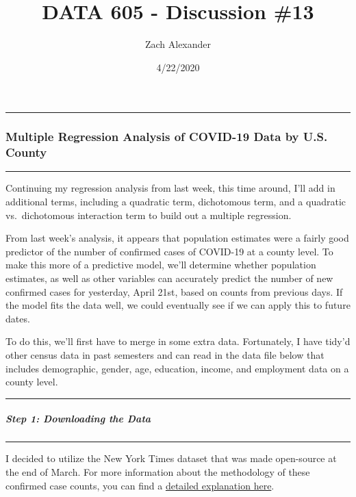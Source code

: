 \documentclass[
]{article}
\title{DATA 605 - Discussion \#13}
\author{Zach Alexander}
\date{4/22/2020}
\begin{document}
\maketitle

\begin{center}\rule{0.5\linewidth}{0.5pt}\end{center}

\hypertarget{multiple-regression-analysis-of-covid-19-data-by-u.s.-county}{%
\subsubsection{Multiple Regression Analysis of COVID-19 Data by U.S.
County}\label{multiple-regression-analysis-of-covid-19-data-by-u.s.-county}}

\begin{center}\rule{0.5\linewidth}{0.5pt}\end{center}

Continuing my regression analysis from last week, this time around, I'll
add in additional terms, including a quadratic term, dichotomous term,
and a quadratic vs.~dichotomous interaction term to build out a multiple
regression.

From last week's analysis, it appears that population estimates were a
fairly good predictor of the number of confirmed cases of COVID-19 at a
county level. To make this more of a predictive model, we'll determine
whether population estimates, as well as other variables can accurately
predict the number of new confirmed cases for yesterday, April 21st,
based on counts from previous days. If the model fits the data well, we
could eventually see if we can apply this to future dates.

To do this, we'll first have to merge in some extra data. Fortunately, I
have tidy'd other census data in past semesters and can read in the data
file below that includes demographic, gender, age, education, income,
and employment data on a county level.

\begin{center}\rule{0.5\linewidth}{0.5pt}\end{center}

\hypertarget{step-1-downloading-the-data}{%
\subparagraph{Step 1: Downloading the
Data}\label{step-1-downloading-the-data}}

\begin{center}\rule{0.5\linewidth}{0.5pt}\end{center}

I decided to utilize the New York Times dataset that was made
open-source at the end of March. For more information about the
methodology of these confirmed case counts, you can find a
\href{https://github.com/nytimes/covid-19-data}{detailed explanation
here}.
\end{document}
